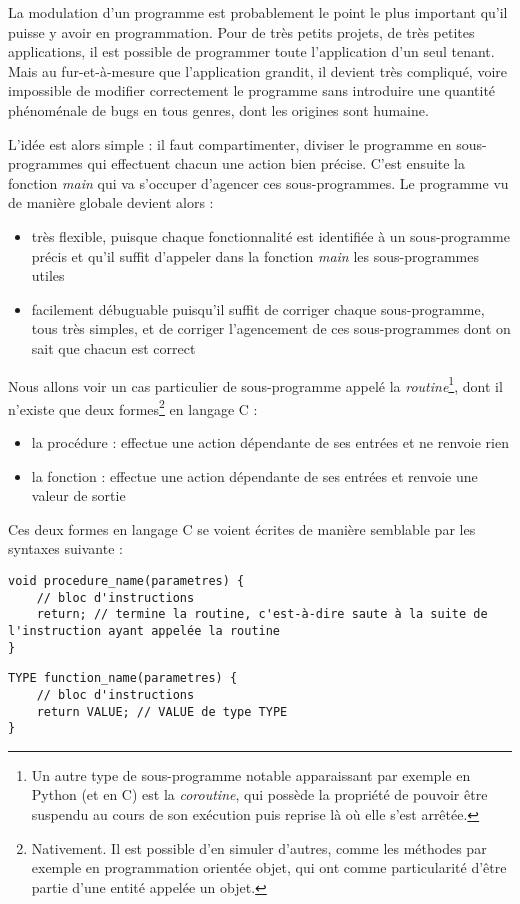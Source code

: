 \documentclass[../../../main.tex]{subfiles}
\begin{document}
La modulation d'un programme est probablement le point le plus important qu'il puisse y avoir en programmation. Pour de très petits projets, de très petites applications, il est possible de programmer toute l'application d'un seul tenant. Mais au fur-et-à-mesure que l'application grandit, il devient très compliqué, voire impossible de modifier correctement le programme sans introduire une quantité phénoménale de bugs en tous genres, dont les origines sont humaine.

L'idée est alors simple : il faut compartimenter, diviser le programme en sous-programmes qui effectuent chacun une action bien précise. C'est ensuite la fonction \textit{main} qui va s'occuper d'agencer ces sous-programmes. Le programme vu de manière globale devient alors :
\begin{itemize}
	\item très flexible, puisque chaque fonctionnalité est identifiée à un sous-programme précis et qu'il suffit d'appeler dans la fonction \textit{main} les sous-programmes utiles
	\item facilement débuguable puisqu'il suffit de corriger chaque sous-programme, tous très simples, et de corriger l'agencement de ces sous-programmes dont on sait que chacun est correct
\end{itemize}
Nous allons voir un cas particulier de sous-programme appelé la \textit{routine}\footnote{Un autre type de sous-programme notable apparaissant par exemple en Python 	(et en C) est la \textit{coroutine}, qui possède la propriété de pouvoir être suspendu au cours de son exécution puis reprise là où elle s'est arrêtée.}, dont il n'existe que deux formes\footnote{Nativement. Il est possible d'en simuler d'autres, comme les méthodes par exemple en programmation orientée objet, qui ont comme particularité d'être partie d'une entité appelée un objet.} en langage C :
\begin{itemize}
	\item la procédure : effectue une action dépendante de ses entrées et ne renvoie rien
	\item la fonction : effectue une action dépendante de ses entrées et renvoie une valeur de sortie
\end{itemize}
Ces deux formes en langage C se voient écrites de manière semblable par les syntaxes suivante :

\begin{minipage}{0.5\textwidth}
\begin{verbatim}
void procedure_name(parametres) {
	// bloc d'instructions
	return; // termine la routine, c'est-à-dire saute à la suite de l'instruction ayant appelée la routine
}
\end{verbatim}
\end{minipage}
\begin{minipage}{0.5\textwidth}
\begin{verbatim}
TYPE function_name(parametres) {
	// bloc d'instructions
	return VALUE; // VALUE de type TYPE
}
\end{verbatim}
\end{minipage}
 
\end{document}
